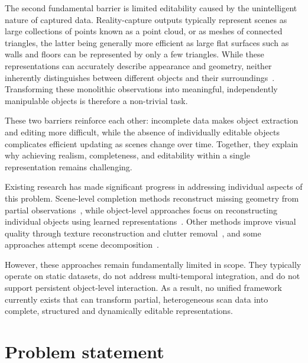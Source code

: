 The second fundamental barrier is limited editability caused by the unintelligent nature of captured data. Reality-capture outputs typically represent scenes as large collections of points known as a point cloud, or as meshes of connected triangles, the latter being generally more efficient as large flat surfaces such as walls and floors can be represented by only a few triangles. While these representations can accurately describe appearance and geometry, neither inherently distinguishes between different objects and their surroundings~\cite{geyter_point_2022}. Transforming these monolithic observations into meaningful, independently manipulable objects is therefore a non-trivial task.

These two barriers reinforce each other: incomplete data makes object extraction and editing more difficult, while the absence of individually editable objects complicates efficient updating as scenes change over time. Together, they explain why achieving realism, completeness, and editability within a single representation remains challenging.

Existing research has made significant progress in addressing individual aspects of this problem. Scene-level completion methods reconstruct missing geometry from partial observations~\cite{dai_scancomplete_2018, dai_spsg_2020, roldao_3d_2022, hubner_voxel-based_2020}, while object-level approaches focus on reconstructing individual objects using learned representations~\cite{mittal_autosdf_2022, chibane_implicit_2020, ren_xcube_2023, cheng_sdfusion_2023}. Other methods improve visual quality through texture reconstruction and clutter removal~\cite{suvorov_resolution-robust_2022, wei_clutter_2023, slavcheva_empty_2024, dolhasz_defurnishing_2025}, and some approaches attempt scene decomposition~\cite{li_hybrid_2024, ardelean_gen3dsr_2025}. 

However, these approaches remain fundamentally limited in scope. They typically operate on static datasets, do not address multi-temporal integration, and do not support persistent object-level interaction. As a result, no unified framework currently exists that can transform partial, heterogeneous scan data into complete, structured and dynamically editable representations.

\section{Problem statement}
\label{sec2:problem}
 
